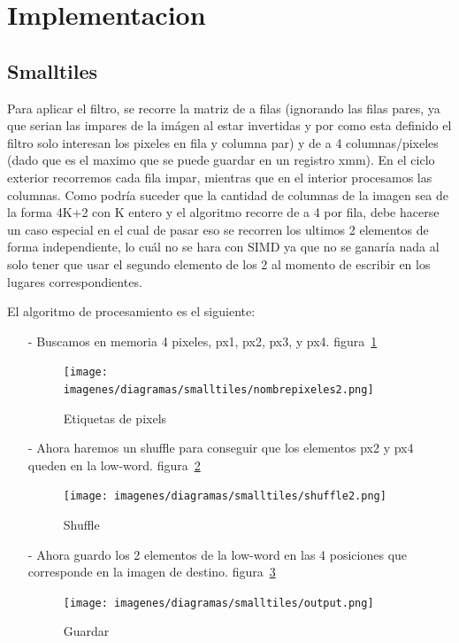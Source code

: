 \documentclass[a4paper]{article}
\begin{document}
\section{Implementacion}


\subsection{Smalltiles}
Para aplicar el filtro, se recorre la matriz de a filas (ignorando las filas pares, ya que serian las impares de la imágen al estar invertidas y por como esta definido el filtro solo interesan los pixeles en fila y columna par) y de a 4 columnas/pixeles (dado que es el maximo que se puede guardar en un registro xmm). En el ciclo exterior recorremos cada fila impar, mientras que en el interior procesamos las columnas. Como podría suceder que la cantidad de columnas de la imagen sea de la forma 4K+2 con K entero y el algoritmo recorre de a 4 por fila, debe hacerse un caso especial en el cual de pasar eso se recorren los ultimos 2 elementos de forma independiente, lo cuál no se hara con SIMD ya que no se ganaría nada al solo tener que usar el segundo elemento de los 2 al momento de escribir en los lugares correspondientes.

El algoritmo de procesamiento es el siguiente:

\begin{itemize}
    \itemsep0em
    \item[-]
        Buscamos en memoria 4 pixeles, px1, px2, px3,  y px4. figura~\ref{nombrepixeles2}
        \begin{figure}[!htb]
          \begin{center}
        	\texttt{[image: imagenes/diagramas/smalltiles/nombrepixeles2.png]}
        	\caption{Etiquetas de pixels}
        	\label{nombrepixeles2}
          \end{center}
        \end{figure}

    \item[-]
        Ahora haremos un shuffle para conseguir que los elementos px2 y px4 queden en la low-word. figura~\ref{shufflePixeles2}
        \begin{figure}[!htb]
          \begin{center}
        	\texttt{[image: imagenes/diagramas/smalltiles/shuffle2.png]}
        	\caption{Shuffle}
        	\label{shufflePixeles2}
          \end{center}
        \end{figure}
    \item[-]
        Ahora guardo los 2 elementos de la low-word en las 4 posiciones que corresponde en la imagen de destino. figura~\ref{output}
        \begin{figure}[!htb]
          \begin{center}
        	\texttt{[image: imagenes/diagramas/smalltiles/output.png]}
        	\caption{Guardar}
        	\label{output}
          \end{center}
        \end{figure}

\end{itemize}
\end{document}
